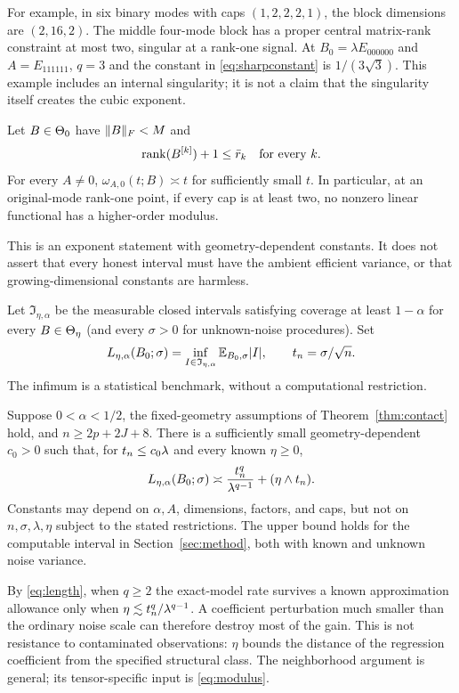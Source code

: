 For example, in six binary modes with caps $(1,2,2,2,1)$, the block dimensions are $(2,16,2)$. The middle four-mode block has a proper central matrix-rank constraint at most two, singular at a rank-one signal. At $B_0=\lambda E_{000000}$ and $A=E_{111111}$, $q=3$ and the constant in \eqref{eq:sharpconstant} is $1/(3\sqrt3)$. This example includes an internal singularity; it is not a claim that the singularity itself creates the cubic exponent.

\begin{proposition}\label{prop:slack}
Let $B\in\Theta_0$ have $\lVert B\rVert_F<M$ and
\[
 \operatorname{rank}(B^{[k]})+1\le\bar r_k\quad\text{for every }k.
\]
For every $A\ne0$, $\omega_{A,0}(t;B)\asymp t$ for sufficiently small $t$. In particular, at an original-mode rank-one point, if every cap is at least two, no nonzero linear functional has a higher-order modulus.
\end{proposition}

This is an exponent statement with geometry-dependent constants. It does not assert that every honest interval must have the ambient efficient variance, or that growing-dimensional constants are harmless.

Let $\mathfrak I_{\eta,\alpha}$ be the measurable closed intervals satisfying coverage at least $1-\alpha$ for every $B\in\Theta_\eta$ (and every $\sigma>0$ for unknown-noise procedures). Set
\[
 L_{\eta,\alpha}(B_0;\sigma)=\inf_{I\in\mathfrak I_{\eta,\alpha}}\mathbb E_{B_0,\sigma}|I|,
 \qquad t_n=\sigma/\sqrt n.
\]
The infimum is a statistical benchmark, without a computational restriction.

\begin{theorem}\label{thm:length}
Suppose $0<\alpha<1/2$, the fixed-geometry assumptions of Theorem~\ref{thm:contact} hold, and $n\ge2p+2J+8$. There is a sufficiently small geometry-dependent $c_0>0$ such that, for $t_n\le c_0\lambda$ and every known $\eta\ge0$,
\begin{equation}\label{eq:length}
 L_{\eta,\alpha}(B_0;\sigma)\asymp
 \frac{t_n^q}{\lambda^{q-1}}+(\eta\wedge t_n).
\end{equation}
Constants may depend on $\alpha,A$, dimensions, factors, and caps, but not on $n,\sigma,\lambda,\eta$ subject to the stated restrictions. The upper bound holds for the computable interval in Section~\ref{sec:method}, both with known and unknown noise variance.
\end{theorem}

By \eqref{eq:length}, when $q\ge2$ the exact-model rate survives a known approximation allowance only when $\eta\lesssim t_n^q/\lambda^{q-1}$. A coefficient perturbation much smaller than the ordinary noise scale can therefore destroy most of the gain. This is not resistance to contaminated observations: $\eta$ bounds the distance of the regression coefficient from the specified structural class. The neighborhood argument is general; its tensor-specific input is \eqref{eq:modulus}.


